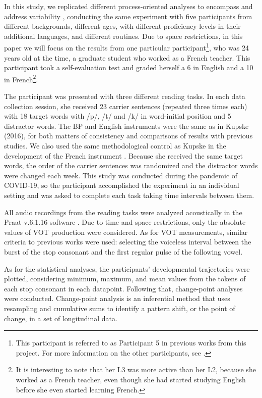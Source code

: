 In this study, we replicated different process-oriented analyses to encompass
and address variability \citep{garcia2013}, conducting the same experiment with
five participants from different backgrounds, different ages, with different
proficiency levels in their additional languages, and different routines. Due
to space restrictions, in this paper we will focus on the results from one
particular participant\footnote{This participant is referred to as Participant
5 in previous works from this project. For more information on the other
participants, see \citet{schereschewsky2021}.}, who was 24 years old at the time, a
graduate student who worked as a French teacher. This participant took a
self-evaluation test \citep{scholl2013}%
and graded herself a 6 in English
and a 10 in French\footnote{It is interesting to note that her L3 was more
active than her L2, because she worked as a French teacher, even though she had
started studying English before she even started learning French.}.

The participant was presented with three different reading tasks. In each data
collection session, she received 23 carrier sentences (repeated three times
each) with 18 target words with /p/, /t/ and /k/ in word-initial position and 5
distractor words. The BP and English instruments were the same as in Kupske
(2016), for both matters of consistency and comparisons of results with
previous studies. We also used the same methodological control as Kupske in the
development of the French instrument \citep[cf.]{schereschewsky2021}. Because she
received the same target words, the order of the carrier sentences was
randomized and the distractor words were changed each week. This study was
conducted during the pandemic of COVID-19, so the participant accomplished the
experiment in an individual setting and was asked to complete each task taking
time intervals between them.

All audio recordings from the reading tasks were analyzed acoustically in the
Praat v.6.1.16 software \citep{boersma2020}. Due to time and space
restrictions, only the absolute values of VOT production were considered. As
for VOT measurements, similar criteria to previous works were used: selecting
the voiceless interval between the burst of the stop consonant and the first
regular pulse of the following vowel.

As for the statistical analyses, the participants' developmental trajectories
were plotted, considering minimum, maximum, and mean values from the tokens of
each stop consonant in each datapoint. Following that, change-point analyses
\citep[cf.]{taylorwayne,steenbeek2012,baba2014,han2018,englhardt2020,henry2021}
were conducted. Change-point analysis is an inferential method that uses resampling
and cumulative sums to identify a pattern shift, or the point of change, in a
set of longitudinal data.

